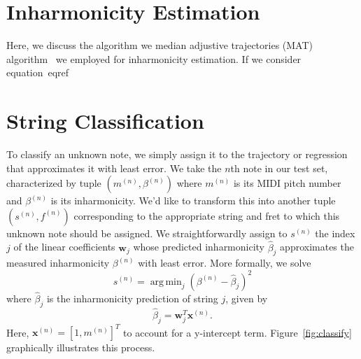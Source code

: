 \documentclass[12pt]{cmuthesis}
\DeclareMathOperator*{\argmin}{arg\,min}
\begin{document}

\section{Inharmonicity Estimation}
Here, we discuss the algorithm we median adjustive trajectories (MAT) algorithm~\cite{hodgkinson2010} we employed for inharmonicity estimation. If we consider equation~eqref\

\section{String Classification}
To classify an unknown note, we simply assign it to the trajectory or regression that approximates it with least error. We take the $n$th note in our test set, characterized by tuple $(m^{(n)},\beta^{(n)})$ where $m^{(n)}$ is its MIDI pitch number and $\beta^{(n)}$ is its inharmonicity. We'd like to transform this into another tuple $(s^{(n)},f^{(n)})$ corresponding to the appropriate string and fret to which this unknown note should be assigned. We straightforwardly assign to $s^{(n)}$ the index $j$ of the linear coefficients $\mathbf{w}_j$ whose predicted inharmonicity $\hat\beta_j$ approximates the measured inharmonicity $\beta^{(n)}$ with least error. More formally, we solve 
\begin{equation}
\label{eq:classify}
s^{(n)} = \argmin_{j}{(\beta^{(n)} - \hat{\beta}_{j})^2}
\end{equation}
where $\hat\beta_j$ is the inharmonicity prediction of string $j$, given by
\begin{equation}
\hat{\beta}_{j} = \mathbf{w}_{j}^T\mathbf{x}^{(n)}.
\end{equation}
Here, $\mathbf{x}^{(n)} = [1, m^{(n)}]^T$ to account for a y-intercept term. Figure~\ref{fig:classify} graphically illustrates this process.
\end{document}
